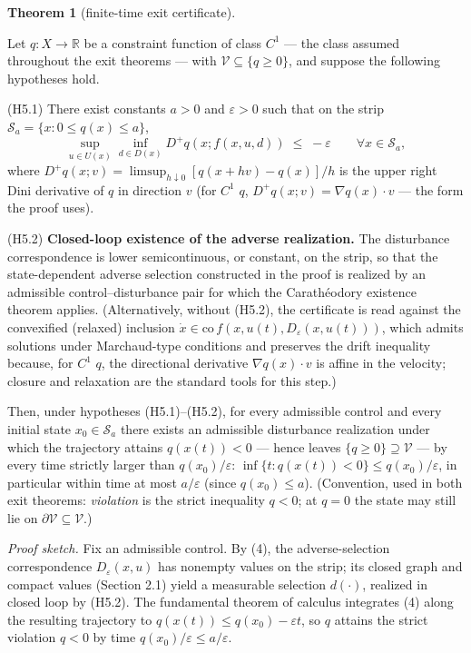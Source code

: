 \documentclass[10pt,twocolumn]{article}
\theoremstyle{definition}
\newtheorem{theorem}{Theorem}
\begin{document}
\begin{theorem}[finite-time exit certificate]\label{calc-thm:exit}

Let \(q : X \to \mathbb{R}\) be a constraint function of class \(C^1\) --- the class assumed throughout the exit theorems --- with
\(\mathcal{V} \subseteq \{ q \ge 0 \}\), and suppose the following
hypotheses hold.

(H5.1) There exist constants \(a > 0\) and \(\varepsilon > 0\) such that
on the strip \(\mathcal{S}_a = \{ x : 0 \le q(x) \le a \}\),
\[\sup_{u \in U(x)} \inf_{d \in D(x)} D^+ q(x; f(x,u,d)) \;\le\; -\varepsilon \qquad \forall x \in \mathcal{S}_a, \tag{4}\]
where \(D^+ q(x; v) = \limsup_{h \downarrow 0} [q(x + hv) - q(x)]/h\) is
the upper right Dini derivative of \(q\) in direction \(v\) (for \(C^1\)
\(q\), \(D^+ q(x; v) = \nabla q(x) \cdot v\) --- the form the proof
uses).

(H5.2) \textbf{Closed-loop existence of the adverse realization.} The
disturbance correspondence is lower semicontinuous, or constant, on the
strip, so that the state-dependent adverse selection constructed in the
proof is realized by an admissible control--disturbance pair for which
the Carath\'eodory existence theorem applies. (Alternatively, without (H5.2), the certificate is read against the convexified (relaxed) inclusion
\(\dot x \in \mathrm{co}\, f(x, u(t), D_{\varepsilon}(x, u(t)))\), which
admits solutions under Marchaud-type conditions and preserves the drift
inequality because, for \(C^1\) \(q\), the directional derivative
\(\nabla q(x)\cdot v\) is affine in the velocity; closure and
relaxation are the standard tools for this step.)

Then, under hypotheses (H5.1)--(H5.2), for every
admissible control and every initial state \(x_0 \in \mathcal{S}_a\)
there exists an admissible disturbance realization under which the
trajectory attains \(q(x(t)) < 0\) --- hence leaves
\(\{ q \ge 0 \} \supseteq \mathcal{V}\) --- by every time strictly
larger than \(q(x_0)/\varepsilon\):
\(\inf\{ t : q(x(t)) < 0 \} \le q(x_0)/\varepsilon\), in particular
within time at most \(a/\varepsilon\) (since \(q(x_0) \le a\)).
(Convention, used in both exit theorems: \emph{violation} is the strict
inequality \(q < 0\); at \(q = 0\) the state may still lie on
\(\partial \mathcal{V} \subseteq \mathcal{V}\).)

\end{theorem}

\emph{Proof sketch.} Fix an admissible control. By (4), the adverse-selection correspondence \(D_\varepsilon(x,u)\) has nonempty values on the strip; its closed graph and compact values (Section 2.1) yield a measurable selection \(d(\cdot)\), realized in closed loop by (H5.2). The fundamental theorem of calculus integrates (4) along the resulting trajectory to \(q(x(t)) \le q(x_0) - \varepsilon t\), so \(q\) attains the strict violation \(q < 0\) by time \(q(x_0)/\varepsilon \le a/\varepsilon\).
\end{document}
